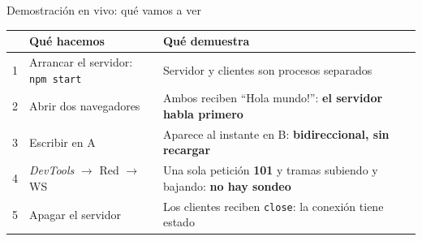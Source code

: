 \documentclass[aspectratio=169,11pt]{beamer}
\begin{document}
\begin{frame}{Demostración en vivo: qué vamos a ver}
  \small
  \renewcommand{\arraystretch}{1.45}
  \begin{tabularx}{\textwidth}{c l X}
    \toprule
    & \textbf{Qué hacemos} & \textbf{Qué demuestra} \\
    \midrule
    1 & Arrancar el servidor: \texttt{npm start} & Servidor y clientes son procesos separados \\
    2 & Abrir dos navegadores & Ambos reciben “Hola mundo!”: \textbf{el servidor habla primero} \\
    3 & Escribir en A & Aparece al instante en B: \textbf{bidireccional, sin recargar} \\
    4 & \emph{DevTools} $\rightarrow$ Red $\rightarrow$ WS & Una sola petición \textbf{101} y tramas subiendo y bajando: \textbf{no hay sondeo} \\
    5 & Apagar el servidor & Los clientes reciben \texttt{close}: la conexión tiene estado \\
    \bottomrule
  \end{tabularx}
\end{frame}
\end{document}
